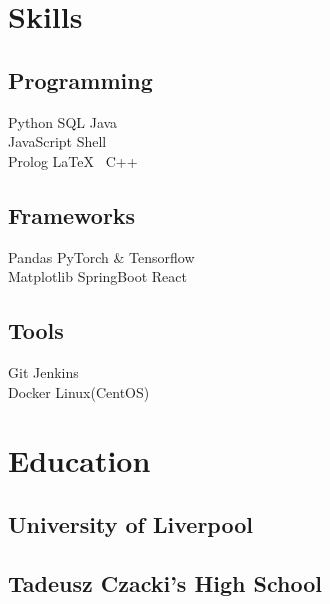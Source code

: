 \documentclass[]{CV}
\begin{document}
\hfill
\begin{minipage}[t]{0.25\textwidth} 


\section{Skills}
\subsection{Programming}
\sectionsep
{}
Python \textbullet{} SQL \textbullet{} Java \\
\sectionsep
{}
JavaScript \textbullet{} Shell \\
\sectionsep
{}
Prolog \textbullet{}  \LaTeX\ \textbullet{} C++ \\
\sectionsep
\sectionsep
\subsection{Frameworks}
\sectionsep
Pandas \textbullet{} PyTorch \& Tensorflow \\  Matplotlib \textbullet{} SpringBoot \textbullet{} React \\
\sectionsep
\sectionsep
\subsection{Tools}
\sectionsep
Git \textbullet{} Jenkins  \\ Docker \textbullet{} Linux(CentOS) \\

\sectionsep


\section{Education} 
\subsection{University of Liverpool}

\sectionsep
\subsection{Tadeusz Czacki's High School}
\sectionsep


\end{minipage}
\end{document}
